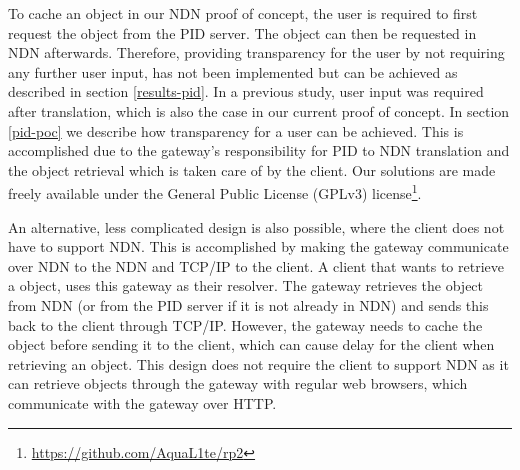 To cache an object in our NDN proof of concept, the user is required to first request the object from the PID server. The object can then be requested in NDN afterwards. Therefore, providing transparency for the user by not requiring any further user input, has not been implemented but can be achieved as described in section \ref{results-pid}. In a previous study, user input was required after translation, which is also the case in our current proof of concept. In section \ref{pid-poc} we describe how transparency for a user can be achieved. This is accomplished due to the gateway’s responsibility for PID to NDN translation and the object retrieval which is taken care of by the client. Our solutions are made freely available under the General Public License (GPLv3) license\footnote{\url{https://github.com/AquaL1te/rp2}}.

An alternative, less complicated design is also possible, where the client does not have to support NDN. This is accomplished by making the gateway communicate over NDN to the NDN and TCP/IP to the client. A client that wants to retrieve a object, uses this gateway as their resolver. The gateway retrieves the object from NDN (or from the PID server if it is not already in NDN) and sends this back to the client through TCP/IP. However, the gateway needs to cache the object before sending it to the client, which can cause delay for the client when retrieving an object. This design does not require the client to support NDN as it can retrieve objects through the gateway with regular web browsers, which communicate with the gateway over HTTP. 

















